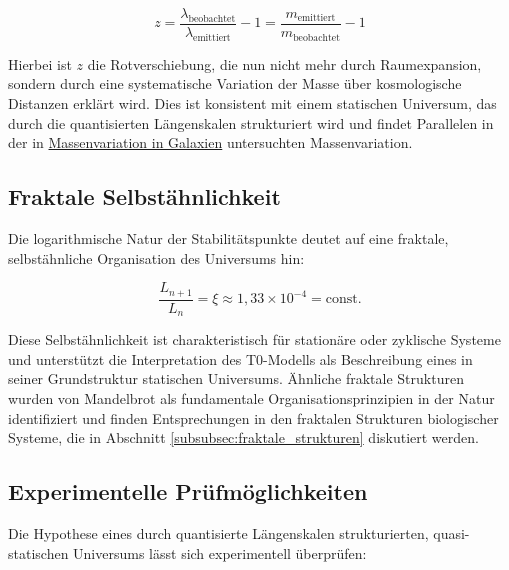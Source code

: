 \documentclass[12pt,a4paper]{article}
\begin{document}
	\begin{equation}
		\label{eq:rotverschiebung}
		z = \frac{\lambda_{\text{beobachtet}}}{\lambda_{\text{emittiert}}} - 1 = \frac{m_{\text{emittiert}}}{m_{\text{beobachtet}}} - 1
	\end{equation}
	
	Hierbei ist $z$ die Rotverschiebung, die nun nicht mehr durch Raumexpansion, sondern durch eine systematische Variation der Masse über kosmologische Distanzen erklärt wird. Dies ist konsistent mit einem statischen Universum, das durch die quantisierten Längen\-skalen strukturiert wird und findet Parallelen in der in \href{https://github.com/jpascher/T0-Time-Mass-Duality/blob/main/2/pdf/Deutsch/MassVarGalaxien.pdf}{Massenvariation in Galaxien} \cite{pascher_mass_var_2025} untersuchten Massenvariation.
	
	\subsection{Fraktale Selbstähnlichkeit}
	\label{subsec:fraktale_selbstaehnlichkeit}
	
	Die logarithmische Natur der Stabilitäts\-punkte deutet auf eine fraktale, selbstähnliche Organisation des Universums hin:
	
	\begin{equation}
		\label{eq:selbstaehnlichkeit}
		\frac{L_{n+1}}{L_n} = \xi \approx 1,33 \times 10^{-4} = \text{const.}
	\end{equation}
	
	Diese Selbstähnlichkeit ist charakteristisch für stationäre oder zyklische Systeme und unterstützt die Interpretation des T0-Modells als Beschreibung eines in seiner Grundstruktur statischen Universums. Ähnliche fraktale Strukturen wurden von Mandelbrot \cite{mandelbrot1983} als fundamentale Organisationsprinzipien in der Natur identifiziert und finden Entsprechungen in den fraktalen Strukturen biologischer Systeme, die in Abschnitt \ref{subsubsec:fraktale_strukturen} diskutiert werden.
	
	\subsection{Experimentelle Prüfmöglichkeiten}
	\label{subsec:experimentelle_pruefung_kosmologie}
	
	Die Hypothese eines durch quantisierte Längen\-skalen strukturierten, quasi-statischen Universums lässt sich experimentell überprüfen:
	
\end{document}
